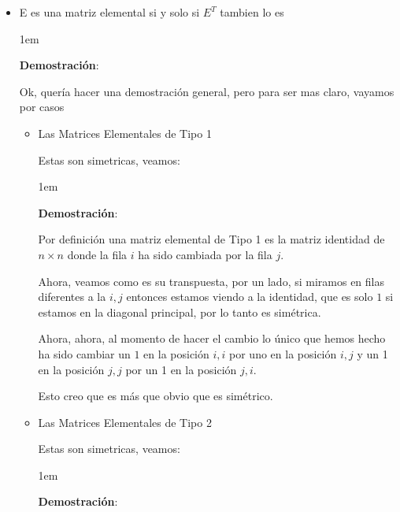 \documentclass[12pt, fleqn]{report}                             %
\newenvironment{SmallIndentation}[1][0.75em]                    %
        {\begin{adjustwidth}{#1}{}\begin{footnotesize}}             %
        {\end{footnotesize}\end{adjustwidth}}                       %
\theoremstyle{break}                                            %
\begin{document}
\begin{itemize}
                \item
                    E es una matriz elemental si y solo si $E^T$ tambien lo es

                    \begin{SmallIndentation}[1em]
                        \textbf{Demostración}:
                        
                        Ok, quería hacer una demostración general, pero para ser mas claro, vayamos por casos
                        \begin{itemize}
                            \item Las Matrices Elementales de Tipo 1

                                Estas son simetricas, veamos:
                                \begin{SmallIndentation}[1em]
                                    \textbf{Demostración}:
                                    
                                    Por definición una matriz elemental de Tipo 1 es la matriz identidad de $n \times n$
                                    donde la fila $i$ ha sido cambiada por la fila $j$.

                                    Ahora, veamos como es su transpuesta, por un lado, si miramos en filas diferentes a la $i, j$
                                    entonces estamos viendo a la identidad, que es solo $1$ si estamos en la diagonal principal, por
                                    lo tanto es simétrica.

                                    Ahora, ahora, al momento de hacer el cambio lo único que hemos hecho ha sido cambiar un $1$ en la
                                    posición $i, i$ por uno en la posición $i, j$ y un 1 en la posición $j, j$ por un 1 en la posición $j, i$.

                                    Esto creo que es más que obvio que es simétrico.

                                \end{SmallIndentation}

                            \item Las Matrices Elementales de Tipo 2

                                Estas son simetricas, veamos:
                                \begin{SmallIndentation}[1em]
                                    \textbf{Demostración}:
                                    

\end{SmallIndentation}
\end{itemize}
\end{SmallIndentation}
\end{itemize}
\end{document}
